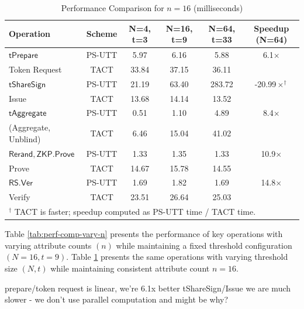 \begin{table}[htbp]
\centering
\caption[Threshold ABC Performance Comparison, fixed attribute length, varying number of nodes]{Performance Comparison for $n = 16$ (milliseconds)}
\begin{tabular}{lccccc}
\toprule
\textbf{Operation} & \textbf{Scheme} & \textbf{N=4, t=3} & \textbf{N=16, t=9} & \textbf{N=64, t=33} & \textbf{Speedup (N=64)} \\
\midrule
$\mathsf{tPrepare}$ & PS-UTT & 5.97 & 6.16 & 5.88 & 6.1$\times$ \\
Token Request              & TACT   & 33.84 & 37.15 & 36.11 & \\
\midrule
$\mathsf{tShareSign}$         & PS-UTT & 21.19 & 63.40 & 283.72 & -20.99$\times^\dagger$ \\
Issue              & TACT   & 13.68 & 14.14 & 13.52 & \\
\midrule
$\mathsf{tAggregate}$ & PS-UTT & 0.51 & 1.10 & 4.89 & 8.4$\times$ \\
(Aggregate, Unblind)                     & TACT   & 6.46 & 15.04 & 41.02 & \\
\midrule
$\mathsf{Rerand, ZKP.Prove}$         & PS-UTT & 1.33 & 1.35 & 1.33 & 10.9$\times$\\
Prove              & TACT   & 14.67 & 15.78 & 14.55 & \\
\midrule
$\mathsf{RS.Ver}$        & PS-UTT & 1.69 & 1.82 & 1.69 & 14.8$\times$ \\
Verify              & TACT   & 23.51 & 26.64 & 25.03 & \\
\bottomrule
\multicolumn{6}{l}{\small $^\dagger$ TACT is faster; speedup computed as PS-UTT time / TACT time.}
\end{tabular}
\label{tab:perf-comp-vary-N}

\end{table}


Table \ref{tab:perf-comp-vary-n} presents the performance of key operations with varying attribute counts $(n)$ while maintaining a fixed threshold configuration $(N=16, t=9)$. Table \ref{tab:perf-comp-vary-N} presents the same operations with varying threshold size $(N, t)$ while maintaining consistent attribute count $n = 16$. 


prepare/token request is linear, we're 6.1x better
tShareSign/Issue we are much slower - we don't use parallel computation and might be why?
















